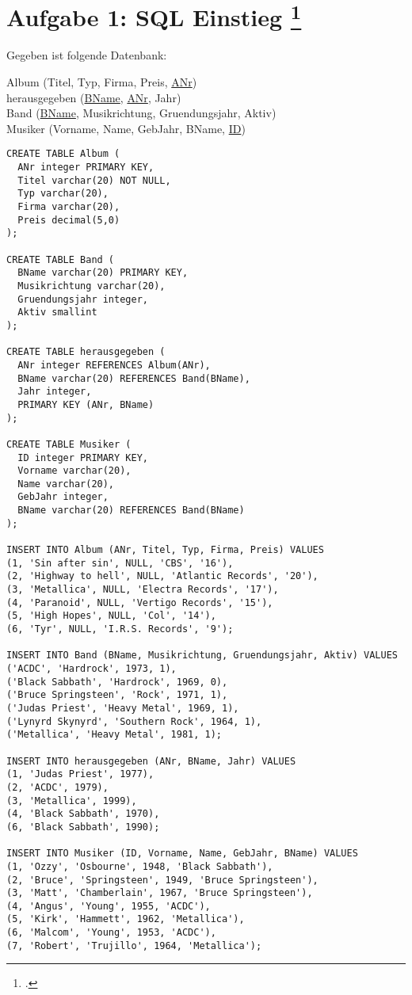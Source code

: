 \documentclass{lehramt-informatik-aufgabe}
\begin{document}

\section{Aufgabe 1: SQL Einstieg
\footcite{db:pu:2}}

Gegeben ist folgende Datenbank: \bigskip

{
\ttfamily
\noindent
Album (Titel, Typ, Firma, Preis, \underline{ANr})\\
\noindent
herausgegeben (\underline{BName}, \underline{ANr}, Jahr)\\
\noindent
Band (\underline{BName}, Musikrichtung, Gruendungsjahr, Aktiv)\\
\noindent
Musiker (Vorname, Name, GebJahr, BName, \underline{ID})\\
}

\begin{verbatim}
CREATE TABLE Album (
  ANr integer PRIMARY KEY,
  Titel varchar(20) NOT NULL,
  Typ varchar(20),
  Firma varchar(20),
  Preis decimal(5,0)
);

CREATE TABLE Band (
  BName varchar(20) PRIMARY KEY,
  Musikrichtung varchar(20),
  Gruendungsjahr integer,
  Aktiv smallint
);

CREATE TABLE herausgegeben (
  ANr integer REFERENCES Album(ANr),
  BName varchar(20) REFERENCES Band(BName),
  Jahr integer,
  PRIMARY KEY (ANr, BName)
);

CREATE TABLE Musiker (
  ID integer PRIMARY KEY,
  Vorname varchar(20),
  Name varchar(20),
  GebJahr integer,
  BName varchar(20) REFERENCES Band(BName)
);

INSERT INTO Album (ANr, Titel, Typ, Firma, Preis) VALUES
(1, 'Sin after sin', NULL, 'CBS', '16'),
(2, 'Highway to hell', NULL, 'Atlantic Records', '20'),
(3, 'Metallica', NULL, 'Electra Records', '17'),
(4, 'Paranoid', NULL, 'Vertigo Records', '15'),
(5, 'High Hopes', NULL, 'Col', '14'),
(6, 'Tyr', NULL, 'I.R.S. Records', '9');

INSERT INTO Band (BName, Musikrichtung, Gruendungsjahr, Aktiv) VALUES
('ACDC', 'Hardrock', 1973, 1),
('Black Sabbath', 'Hardrock', 1969, 0),
('Bruce Springsteen', 'Rock', 1971, 1),
('Judas Priest', 'Heavy Metal', 1969, 1),
('Lynyrd Skynyrd', 'Southern Rock', 1964, 1),
('Metallica', 'Heavy Metal', 1981, 1);

INSERT INTO herausgegeben (ANr, BName, Jahr) VALUES
(1, 'Judas Priest', 1977),
(2, 'ACDC', 1979),
(3, 'Metallica', 1999),
(4, 'Black Sabbath', 1970),
(6, 'Black Sabbath', 1990);

INSERT INTO Musiker (ID, Vorname, Name, GebJahr, BName) VALUES
(1, 'Ozzy', 'Osbourne', 1948, 'Black Sabbath'),
(2, 'Bruce', 'Springsteen', 1949, 'Bruce Springsteen'),
(3, 'Matt', 'Chamberlain', 1967, 'Bruce Springsteen'),
(4, 'Angus', 'Young', 1955, 'ACDC'),
(5, 'Kirk', 'Hammett', 1962, 'Metallica'),
(6, 'Malcom', 'Young', 1953, 'ACDC'),
(7, 'Robert', 'Trujillo', 1964, 'Metallica');
\end{verbatim}
\end{document}
